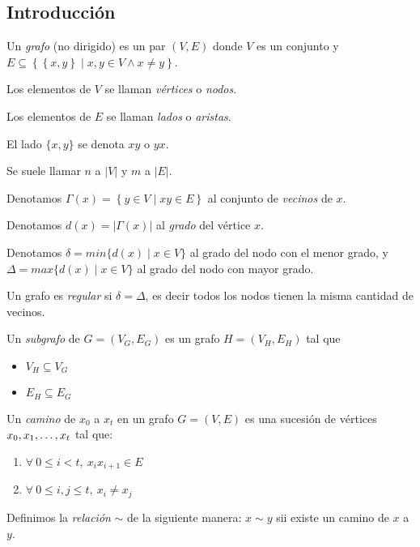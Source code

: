 \subsection{Introducción}

\begin{definition}
  Un \emph{grafo} (no dirigido) es un par $(V, E)$ donde $V$ es un conjunto y
  $E \subseteq \left\{\left\{x,y\right\} \mid x,y \in V \wedge x \neq y \right\}$.
\end{definition}

\begin{notation}
  Los elementos de $V$ se llaman \emph{vértices} o \emph{nodos}.

  Los elementos de $E$ se llaman \emph{lados} o \emph{aristas}.

  El lado $\{x,y\}$ se denota $xy$ o $yx$.

  Se suele llamar $n$ a $|V|$ y $m$ a $|E|$.

  Denotamos $\Gamma(x) = \left\{y \in V \mid xy \in E \right\}$ al conjunto de
  \emph{vecinos} de $x$.

  Denotamos $d(x) = |\Gamma(x)|$ al \emph{grado} del vértice $x$.

  Denotamos $\delta = min\{d(x) \mid x\in V\}$ al grado del nodo con el menor
  grado, y $\Delta = max\{d(x) \mid x\in V\}$ al grado del nodo con mayor grado.

\end{notation}

\begin{definition}
  Un grafo es \emph{regular} si $\delta = \Delta$, es decir todos los nodos
  tienen la misma cantidad de vecinos.
\end{definition}

\begin{definition}
  Un \emph{subgrafo} de $G = (V_G,E_G)$ es un grafo $H = (V_H,E_H)$ tal que 
  \begin{itemize}
    \item $V_H \subseteq V_G$
    \item $E_H \subseteq E_G$
  \end{itemize}
\end{definition}

\begin{definition}
Un \emph{camino} de $x_0$ a $x_t$ en un grafo $G = (V,E)$ es una sucesión de vértices $x_0, x_1, \mathellipsis, x_t$ tal que:
\begin{enumerate}
    \item $\forall~0 \le i < t,~x_i x_{i+1} \in E$
    \item $\forall~0 \le i, j \le t,~x_i \neq x_j$
\end{enumerate}

Definimos la \emph{relación} $\sim$ de la siguiente manera: $x \sim y$ sii existe un camino de $x$ a $y$.
\end{definition}

